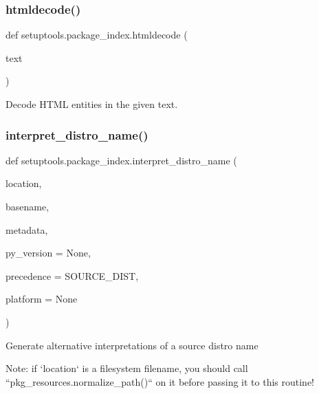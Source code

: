 \subsubsection{\texorpdfstring{htmldecode()}{htmldecode()}}
{\footnotesize\ttfamily def setuptools.\+package\+\_\+index.\+htmldecode (\begin{DoxyParamCaption}\item[{}]{text }\end{DoxyParamCaption})}

\begin{DoxyVerb}Decode HTML entities in the given text.\end{DoxyVerb}
 \mbox{\label{namespacesetuptools_1_1package__index_a1efdd05a9931992ea9882621aba5d104}} 
\subsubsection{\texorpdfstring{interpret\+\_\+distro\+\_\+name()}{interpret\_distro\_name()}}
{\footnotesize\ttfamily def setuptools.\+package\+\_\+index.\+interpret\+\_\+distro\+\_\+name (\begin{DoxyParamCaption}\item[{}]{location,  }\item[{}]{basename,  }\item[{}]{metadata,  }\item[{}]{py\+\_\+version = {\ttfamily None},  }\item[{}]{precedence = {\ttfamily SOURCE\+\_\+DIST},  }\item[{}]{platform = {\ttfamily None} }\end{DoxyParamCaption})}

\begin{DoxyVerb}Generate alternative interpretations of a source distro name

Note: if `location` is a filesystem filename, you should call
``pkg_resources.normalize_path()`` on it before passing it to this
routine!
\end{DoxyVerb}
 \mbox{\label{namespacesetuptools_1_1package__index_a54dcf838d95efdcc84ef4720d32be7a7}} 
